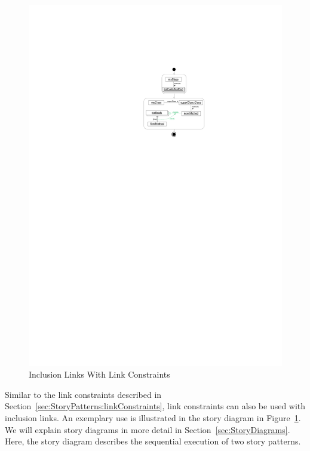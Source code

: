 
\begin{figure}[htb]
  \centering
  \includegraphics[scale=.8]{figures/LinkConstraints1}
  \caption{Inclusion Links With Link Constraints}
  \label{fig:collectionsLinkConstraints}
\end{figure}

Similar to the link constraints described in Section~\ref{sec:StoryPatterns:linkConstraints}, link constraints can also be used with inclusion links.
An exemplary use is illustrated in the story diagram in Figure~\ref{fig:collectionsLinkConstraints}.
We will explain story diagrams in more detail in Section~\ref{sec:StoryDiagrams}.
Here, the story diagram describes the sequential execution of two story patterns.

